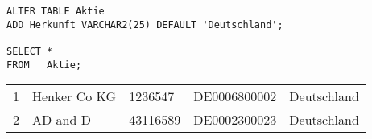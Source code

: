 \begin{lstlisting}[language=oracle_sql,caption={Tabellenspalte mit Standardwert hinzufügen in Oracle},label=sql08_09]
ALTER TABLE Aktie
ADD Herkunft VARCHAR2(25) DEFAULT 'Deutschland';

SELECT *
FROM   Aktie;
          \end{lstlisting}
\begin{center}
    \begin{small}
        \tablehead{}
        \begin{oraclesql}
            \begin{supertabular}{rllll}
                1 & Henker Co KG & 1236547 & DE0006800002 & Deutschland \\
                2 & AD and D & 43116589 & DE0002300023 & Deutschland \\
            \end{supertabular}
        \end{oraclesql}
    \end{small}
\end{center}

